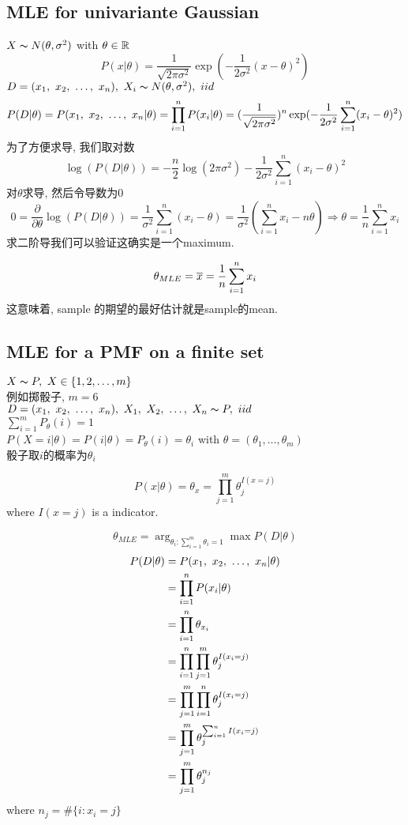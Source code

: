 \documentclass{article}
\begin{document}
\subsection{MLE for univariante Gaussian}
$X \thicksim{N}(\theta, \sigma^2)$ with $\theta \in \mathbb{R}$
$$P(x|\theta) = \dfrac{1}{\sqrt{2\pi \sigma^2}} \exp(-\dfrac{1}{2\sigma^2}(x-\theta)^2)$$
$D = (x_1,~x_2,~\ldots,~x_n),\ X_i \thicksim{N}(\theta, \sigma^2),\ iid$
$$
P(D|\theta)
= P(x_1,~x_2,~\ldots,~x_n| \theta)
= \prod_{i=1}^n P(x_i|\theta)
= (\dfrac{1}{\sqrt{2\pi \sigma^2}})^n \exp(-\dfrac{1}{2\sigma^2} \sum_{i=1}^n (x_i -\theta)^2)
$$
为了方便求导, 我们取对数
$$
\log(P(D|\theta)) = -\dfrac{n}{2} \log(2 \pi \sigma^2) - \dfrac{1}{2\sigma^2} \sum_{i=1}^n (x_i - \theta)^2
$$
对$\theta$求导, 然后令导数为$0$
$$
0 = \dfrac{\partial }{\partial \theta} \log(P(D|\theta))
= \dfrac{1}{\sigma^2} \sum_{i=1}^n (x_i - \theta)
= \dfrac{1}{\sigma^2} (\sum_{i=1}^n x_i - n \theta)
\Rightarrow \theta = \dfrac{1}{n} \sum_{i=1}^n x_i
$$
求二阶导我们可以验证这确实是一个maximum.

$$\theta_{MLE} = \overline{x} = \dfrac{1}{n} \sum_{i=1}^n x_i$$
这意味着, sample 的期望的最好估计就是sample的mean.

\subsection{MLE for a PMF on a finite  set}
$X \thicksim{P},\ X \in \{1,2,\ldots, m\}$\\
例如掷骰子, $m=6$\\
$D = (\vector{x}),\ \vector{X} \obey P,\ iid$\\
$\sum_{i=1}^m P_\theta(i) = 1$\\
$P(X=i|\theta) = P(i|\theta) = P_\theta(i) = \theta_i$ with $\theta = (\theta_1, \ldots, \theta_m)$\\
骰子取$i$的概率为$\theta_i$

$$P(x|\theta) = \theta_x= \prod_{j= 1}^m \theta_j^{I(x=j)}$$
where $I(x=j)$ is a indicator.

$$\theta_{MLE} = \arg_{\theta_i: \sum_{i=1}^m \theta_i =1} \max P(D|\theta)$$
$$
\begin{aligned}
P(D|\theta)
& = P(x_1,~x_2,~\ldots,~x_n| \theta) \\
& = \prod_{i=1}^n P(x_i|\theta) \\
& = \prod_{i=1}^n \theta_{x_i}\\
& = \prod_{i=1}^n \prod_{j=1}^m \theta_j^{I(x_i = j)}\\
& = \prod_{j=1}^m \prod_{i=1}^n \theta_j^{I(x_i = j)}\\
& = \prod_{j=1}^m \theta_j^{ \sum_{i=1}^n I(x_i = j)}\\
& = \prod_{j=1}^m \theta_j^{n_j}\\
\end{aligned}
$$
where $n_j = \#\{i: x_i = j\}$
\end{document}
